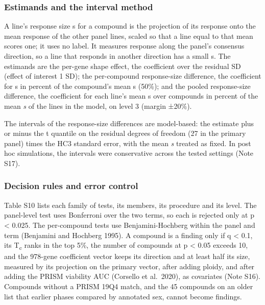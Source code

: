 \documentclass[
  11pt,
  letterpaper,
]{article}
\begin{document}
\subsubsection{Estimands and the interval
method}\label{estimands-and-the-interval-method}

A line's response size s for a compound is the projection of its
response onto the mean response of the other panel lines, scaled so that
a line equal to that mean scores one; it uses no label. It measures
response along the panel's consensus direction, so a line that responds
in another direction has a small s. The estimands are the per-gene shape
effect, the coefficient over the residual SD (effect of interest 1 SD);
the per-compound response-size difference, the coefficient for s in
percent of the compound's mean s (50\%); and the pooled response-size
difference, the coefficient for each line's mean s over compounds in
percent of the mean \emph{s} of the lines in the model, on level 3
(margin ±20\%).

The intervals of the response-size differences are model-based: the
estimate plus or minus the t quantile on the residual degrees of freedom
(27 in the primary panel) times the HC3 standard error, with the mean
\emph{s} treated as fixed. In post hoc simulations, the intervals were
conservative across the tested settings (Note S17).

\subsubsection{Decision rules and error
control}\label{decision-rules-and-error-control}

Table S10 lists each family of tests, its members, its procedure and its
level. The panel-level test uses Bonferroni over the two terms, so each
is rejected only at p \textless{} 0.025. The per-compound tests use
Benjamini-Hochberg within the panel and term (Benjamini and Hochberg
1995). A compound is a finding only if q \textless{} 0.1, its
T\textsubscript{c} ranks in the top 5\%, the number of compounds at p
\textless{} 0.05 exceeds 10, and the 978-gene coefficient vector keeps
its direction and at least half its size, measured by its projection on
the primary vector, after adding ploidy, and after adding the PRISM
viability AUC (Corsello et al.~2020), as covariates (Note S16).
Compounds without a PRISM 19Q4 match, and the 45 compounds on an older
list that earlier phases compared by annotated sex, cannot become
findings.
\end{document}
